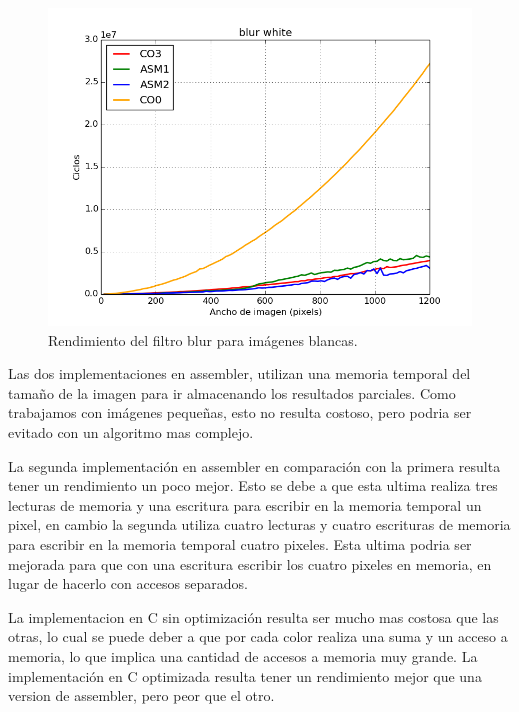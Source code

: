 \documentclass[a4paper]{article}
\begin{document}
\begin{figure}[H]
	\begin{center}
		\includegraphics[scale=0.4]{../tp2-bundle.v2/Testing/plots/all/blur-white--all.png}
		\caption{Rendimiento del filtro blur para imágenes blancas.}
		\label{fig:exp1-1}
	\end{center}
\end{figure}



Las dos implementaciones en assembler, utilizan una memoria temporal del tamaño de la imagen para ir almacenando los resultados parciales. Como trabajamos con imágenes pequeñas, esto no resulta costoso, pero podria ser evitado con un algoritmo mas complejo.

La segunda implementación en assembler en comparación con la primera resulta tener un rendimiento un poco mejor. Esto se debe a que esta ultima realiza tres lecturas de memoria y una escritura para escribir en la memoria temporal un pixel, en cambio la segunda utiliza cuatro lecturas y cuatro escrituras de memoria para escribir en la memoria temporal cuatro pixeles. Esta ultima podria ser mejorada para que con una escritura escribir los cuatro pixeles en memoria, en lugar de hacerlo con accesos separados.

La implementacion en C sin optimización resulta ser mucho mas costosa que las otras, lo cual se puede deber a que por cada color realiza una suma y un acceso a memoria, lo que implica una cantidad de accesos a memoria muy grande. La implementación en C optimizada resulta tener un rendimiento mejor que una version de assembler, pero peor que el otro.
\end{document}
